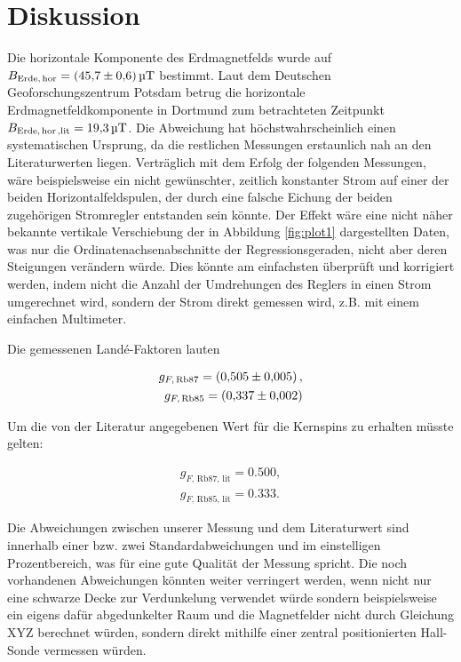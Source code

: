 \section{Diskussion}
\label{sec:Diskussion}

Die horizontale Komponente des Erdmagnetfelds wurde auf $B_\text{Erde,\,hor} = \SI{45.7\pm 0.6}{\micro \tesla}$ bestimmt. Laut dem Deutschen Geoforschungszentrum Potsdam \cite{mag} betrug die horizontale Erdmagnetfeldkomponente in Dortmund zum betrachteten Zeitpunkt $B_\text{Erde,\,hor\,,lit} = \SI{19.3}{\micro \tesla}$. Die Abweichung hat höchstwahrscheinlich einen systematischen Ursprung, da die restlichen Messungen erstaunlich nah an den Literaturwerten liegen. Verträglich mit dem Erfolg der folgenden Messungen, wäre beispielsweise ein nicht gewünschter, zeitlich konstanter Strom auf einer der beiden Horizontalfeldspulen, der durch eine falsche Eichung der beiden zugehörigen Stromregler entstanden sein könnte. Der Effekt wäre eine nicht näher bekannte vertikale Verschiebung der in Abbildung \ref{fig:plot1} dargestellten Daten, was nur die Ordinatenachsenabschnitte der Regressionsgeraden, nicht aber deren Steigungen verändern würde. Dies könnte am einfachsten überprüft und korrigiert werden, indem nicht die Anzahl der Umdrehungen des Reglers in einen Strom umgerechnet wird, sondern der Strom direkt gemessen wird, z.B. mit einem einfachen Multimeter.

Die gemessenen Landé-Faktoren lauten

\begin{eqnarray}
	g_{F,\, \text{Rb}87} = \SI{0.505 \pm 0.005},\\
	g_{F,\, \text{Rb}85} = \SI{0.337 \pm 0.002}.
\end{eqnarray}

Um die von der Literatur \cite{Rb} angegebenen Wert für die Kernspins zu erhalten müsste gelten:

\begin{eqnarray}
g_{F,\, \text{Rb}87, \, \text{lit}} = \SI{0.500},\\
g_{F,\, \text{Rb}85, \, \text{lit}} = \SI{0.333}.
\end{eqnarray}

Die Abweichungen zwischen unserer Messung und dem Literaturwert sind innerhalb einer bzw. zwei Standardabweichungen und im einstelligen Prozentbereich, was für eine gute Qualität der Messung spricht. Die noch vorhandenen Abweichungen könnten weiter verringert werden, wenn nicht nur eine schwarze Decke zur Verdunkelung verwendet würde sondern beispielsweise ein eigens dafür abgedunkelter Raum und die Magnetfelder nicht durch Gleichung XYZ berechnet würden, sondern direkt mithilfe einer zentral positionierten Hall-Sonde vermessen würden. 

